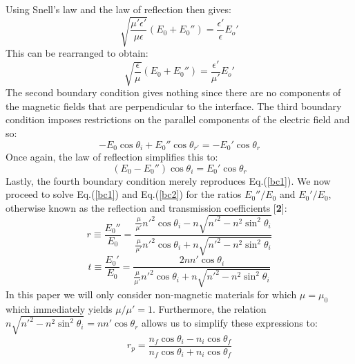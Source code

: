 \documentclass[preprint, onecolumn, amsmath, amssymb, aps]{revtex4-1}
\numberwithin{equation}{section}
\begin{document}
\noindent
Using Snell's law and the law of reflection then gives:
\begin{equation}
\sqrt{ \frac{\mu' \epsilon'}{\mu \epsilon} } (E_{0} + E_{0}'' ) = \frac{\epsilon'}{\epsilon} E_{o}'
\end{equation}
\noindent
This can be rearranged to obtain:
\begin{equation}\label{bc1}
\sqrt{ \frac{\epsilon}{\mu} } (E_{0} + E_{0}'' ) = \frac{\epsilon'}{\mu'} E_{o}'
\end{equation}
\noindent
The second boundary condition gives nothing since there are no components of the magnetic fields that are perpendicular to the interface. The third boundary condition imposes restrictions on the parallel components of the electric field and so:
\begin{equation}
-E_{0} \cos \theta_{i} + E_{0}'' \cos \theta_{r'} = -E_{0}' \cos \theta_{r} 
\end{equation}
\noindent
Once again, the law of reflection simplifies this to:
\begin{equation}\label{bc2}
( E_{0} - E_{0}'' ) \cos \theta_{i} = E_{0}' \cos \theta_{r} 
\end{equation}
\noindent
Lastly, the fourth boundary condition merely reproduces Eq.(\ref{bc1}). We now proceed to solve Eq.(\ref{bc1}) and Eq.(\ref{bc2}) for the ratios $E_{0}'' / E_{0}$ and $E_{0}' / E_{0}$, otherwise known as the reflection and transmission coefficients [\textbf{2}]:
\begin{equation}
r \equiv \frac{E_{0}''}{E_{0}} = \frac{ \frac{\mu}{\mu'} n'^{2} \cos \theta_{i} - n \sqrt{ n'^{2} - n^{2} \sin^{2} \theta_{i}}} {\frac{\mu}{\mu'} n'^{2} \cos \theta_{i} + n \sqrt{ n'^{2} - n^{2} \sin^{2} \theta_{i}}}
\end{equation}
\begin{equation}
t \equiv \frac{E_{0}'}{E_{0}} = \frac{2 n n' \cos \theta_{i}}{\frac{\mu}{\mu'} n'^{2} \cos \theta_{i} + n \sqrt{ n'^{2} - n^{2} \sin^{2} \theta_{i}}}
\end{equation}
\noindent
In this paper we will only consider non-magnetic materials for which $\mu = \mu_{0}$ which immediately yields $\mu / \mu' = 1$. Furthermore, the relation $n \sqrt{ n'^{2} - n^{2} \sin^{2} \theta_{i}} = n n' \cos \theta_{r}$ allows us to simplify these expressions to:
\begin{equation}\label{fresnel1}
r_{p} = \frac{ n_{f} \cos \theta_{i} - n_{i} \cos \theta_{f} }{ n_{f} \cos \theta_{i} + n_{i} \cos \theta_{f}}
\end{equation}
\end{document}
